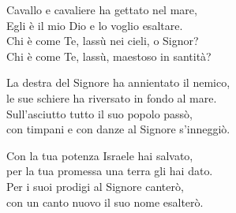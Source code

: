 
 

\spazio

\strofa Cavallo e cavaliere ha gettato nel mare,\\
Egli è il mio Dio e lo voglio esaltare.\\
Chi è come Te, lassù nei cieli, o Signor?\\
Chi è come Te, lassù, maestoso in santità?

\spazio


\spazio

\strofa La destra del Signore ha annientato il nemico,\\
le sue schiere ha riversato in fondo al mare.\\
Sull'asciutto tutto il suo popolo passò,\\
con timpani e con danze al Signore s'inneggiò.

\spazio


\spazio

\strofa Con la tua potenza Israele hai salvato,\\
per la tua promessa una terra gli hai dato.\\
Per i suoi prodigi al Signore canterò,\\
con un canto nuovo il suo nome esalterò.

\spazio

